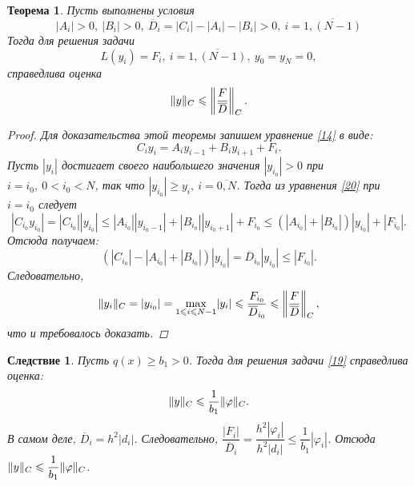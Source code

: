 \documentclass[11pt,a4paper,twoside]{report}
\numberwithin{equation}{section}
\theoremstyle{definition}
\theoremstyle{plain}
\newtheorem{theorem}{Теорема}[section]
\newtheorem{cons}{Следствие}[section]
\DeclarePairedDelimiter\norm{\lVert}{\rVert}
\begin{document}
\begin{theorem}
%
    Пусть выполнены условия
    \begin{equation}
        \label{18}
        |A_i|>0,~|B_i|>0,~\overline{D}_i = |C_i| - |A_i| - |B_i| > 0,~i
        = \overline{1,(N-1)}
    \end{equation}
    Тогда для решения задачи
    \begin{equation}
        \label{19}
        L(y_i)=F_i,~i=\overline{1,(N-1)},~y_0=y_N=0,
    \end{equation}
    справедлива оценка
    $$
        \norm{y}_C \leqslant \left\lVert\dfrac{F}{\overline{D}}\right\rVert_C.
    $$
    \begin{proof}
        Для доказательства этой теоремы запишем уравнение \eqref{14} в виде:
        \begin{equation}
            \label{20}
            C_iy_i=A_iy_{i-1}+B_iy_{i+1}+F_i.
        \end{equation}
        Пусть $|y_i|$ достигает своего наибольшего значения $|y_{i_0}|>0$ при
        $i=i_0,~0<i_0<N$, так что $|y_{i_0}|\geqslant y_i, ~i=\overline{0,N}$.
        Тогда из уравнения \eqref{20} при $i=i_0$ следует
        $$
            |C_{i_0}y_{i_0}|=|C_{i_0}||y_{i_0}| \leqslant
            |A_{i_0}||y_{i_0-1}| + |B_{i_0}||y_{i_0+1}| + F_{i_0} \leqslant
            \left(|A_{i_0}|+|B_{i_0}|\right)|y_{i_0}|+|F_{i_0}|.
        $$
        Отсюда получаем:
        $$
            (|C_{i_0}|-|A_{i_0}|+|B_{i_0}|)|y_{i_0}| =
            \overline{D}_{i_0}|y_{i_0}| \leqslant |F_{i_0}|.
        $$
        Следовательно,
        $$
            \norm{y_i}_C=|y_{i_0}|=\underset{1 \leqslant i \leqslant N-1}
            \max|y_i| \leqslant \dfrac{F_{i_0}}{\overline{D}_{i_0}} \leqslant
            \left\lVert\dfrac{F}{\overline{D}}\right\rVert_C,
        $$
        что и требовалось доказать.
    \end{proof}
%
\end{theorem}
%
\begin{cons}
%
    Пусть $q(x) \geqslant b_1>0$. Тогда для решения задачи \eqref{19}
    справедлива оценка:
    $$
        \norm{y}_C\leqslant\dfrac{1}{b_1}\norm{\varphi}_C.
    $$
    В самом деле, $\overline{D}_i=h^2|d_i|$. Следовательно,
    $\dfrac{|F_i|}{\overline{D}_i} = \dfrac{h^2|\varphi_i|}{h^2|d_i|}
    \leqslant\dfrac{1}{b_1}|\varphi_i|$. Отсюда
    $\norm{y}_C\leqslant\dfrac{1}{b_1}\norm{\varphi}_C$.
%
\end{cons}
%
%
%
%
\end{document}
